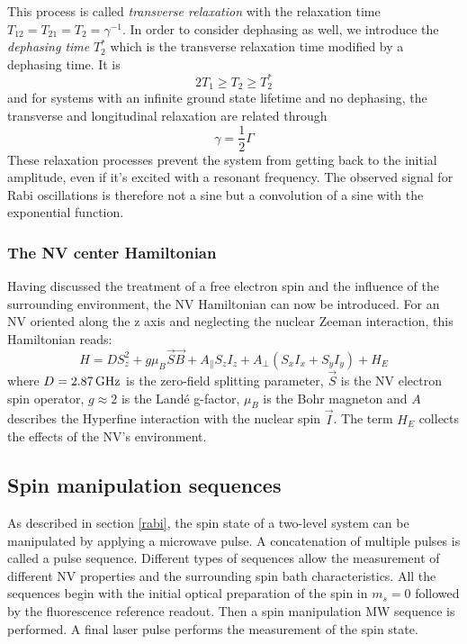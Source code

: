 \documentclass[12pt,a4paper]{article}
\begin{document}
This process is called \textit{transverse relaxation} with the relaxation time $T_{12}=T_{21}=T_2=\gamma^{-1}$. In order to consider dephasing as well, we introduce the \textit{dephasing time} $T_2^*$ which is the transverse relaxation time modified by a dephasing time. It is \cite{ttwo}
\begin{equation}
2T_1\geq T_2\geq T_2^*
\end{equation} 
and for systems with an infinite ground state lifetime and no dephasing, the transverse and longitudinal relaxation are related through
\begin{equation}
\gamma=\frac{1}{2}\Gamma
\end{equation} 
These relaxation processes prevent the system from getting back to the initial amplitude, even if it's excited with a resonant frequency. The observed signal for Rabi oscillations is therefore not a sine but a convolution of a sine with the exponential function.

\subsubsection{The NV center Hamiltonian}\label{ham}
Having discussed the treatment of a free electron spin and the influence of the surrounding environment, the NV Hamiltonian can now be introduced. For an NV oriented along the z axis and neglecting the nuclear Zeeman interaction, this Hamiltonian reads\cite{nv1}:
\begin{equation}
H=DS_z^2+g\mu_B\vec{S}\vec{B}+A_\parallel S_zI_z+A_\perp(S_xI_x+S_yI_y)+H_E
\end{equation}
where $D=\unit[2.87]{GHz}$ is the zero-field splitting parameter, $\vec{S}$ is the NV electron spin operator, $g\approx 2$ is the Landé g-factor, $\mu_B$ is the Bohr magneton and $A$ describes the Hyperfine interaction with the nuclear spin $\vec{I}$. The term $H_E$ collects the effects of the NV's environment. 
\subsection{Spin manipulation sequences}
As described in section \ref{rabi}, the spin state of a two-level system can be manipulated by applying a microwave pulse. A concatenation of multiple pulses is called a pulse sequence.
Different types of sequences allow the measurement of different NV properties and the surrounding spin bath characteristics. All the sequences begin with the initial optical preparation of the spin in $m_s=0$ followed by the fluorescence reference readout. Then a spin manipulation MW sequence is performed. A final laser pulse performs the measurement of the spin state.
\end{document}
